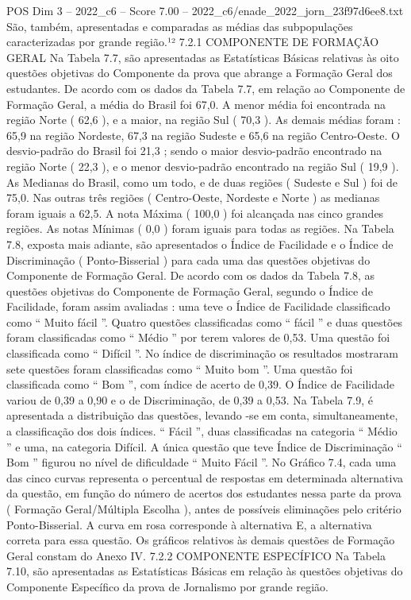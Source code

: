 \begin{textsample}{POS Dim 3 – 2022\_c6 – Score 7.00 – 2022\_c6/enade\_2022\_jorn\_23f97d6ee8.txt}
São, também, apresentadas e comparadas as médias das subpopulações caracterizadas por grande região.¹² 7.2.1 COMPONENTE DE FORMAÇÃO GERAL Na Tabela 7.7, são apresentadas as Estatísticas Básicas relativas às oito questões objetivas do Componente da prova que abrange a Formação Geral dos estudantes.
De acordo com os dados da Tabela 7.7, em relação ao Componente de Formação Geral, a média do Brasil foi 67,0.
A menor média foi encontrada na região Norte ( 62,6 ), e a maior, na região Sul ( 70,3 ).
As demais médias foram : 65,9 na região Nordeste, 67,3 na região Sudeste e 65,6 na região Centro-Oeste.
O desvio-padrão do Brasil foi 21,3 ; sendo o maior desvio-padrão encontrado na região Norte ( 22,3 ), e o menor desvio-padrão encontrado na região Sul ( 19,9 ).
As Medianas do Brasil, como um todo, e de duas regiões ( Sudeste e Sul ) foi de 75,0.
Nas outras três regiões ( Centro-Oeste, Nordeste e Norte ) as medianas foram iguais a 62,5.
A nota Máxima ( 100,0 ) foi alcançada nas cinco grandes regiões.
As notas Mínimas ( 0,0 ) foram iguais para todas as regiões.
Na Tabela 7.8, exposta mais adiante, são apresentados o Índice de Facilidade e o Índice de Discriminação ( Ponto-Bisserial ) para cada uma das questões objetivas do Componente de Formação Geral.
De acordo com os dados da Tabela 7.8, as questões objetivas do Componente de Formação Geral, segundo o Índice de Facilidade, foram assim avaliadas : uma teve o Índice de Facilidade classificado como “ Muito fácil ”.
Quatro questões classificadas como “ fácil ” e duas questões foram classificadas como “ Médio ” por terem valores de 0,53.
Uma questão foi classificada como “ Difícil ”.
No índice de discriminação os resultados mostraram sete questões foram classificadas como “ Muito bom ”.
Uma questão foi classificada como “ Bom ”, com índice de acerto de 0,39.
O Índice de Facilidade variou de 0,39 a 0,90 e o de Discriminação, de 0,39 a 0,53.
Na Tabela 7.9, é apresentada a distribuição das questões, levando -se em conta, simultaneamente, a classificação dos dois índices. “ Fácil ”, duas classificadas na categoria “ Médio ” e uma, na categoria Difícil.
A única questão que teve Índice de Discriminação “ Bom ” figurou no nível de dificuldade “ Muito Fácil ”.
No Gráfico 7.4, cada uma das cinco curvas representa o percentual de respostas em determinada alternativa da questão, em função do número de acertos dos estudantes nessa parte da prova ( Formação Geral/Múltipla Escolha ), antes de possíveis eliminações pelo critério Ponto-Bisserial.
A curva em rosa corresponde à alternativa E, a alternativa correta para essa questão.
Os gráficos relativos às demais questões de Formação Geral constam do Anexo IV. 7.2.2 COMPONENTE ESPECÍFICO Na Tabela 7.10, são apresentadas as Estatísticas Básicas em relação às questões objetivas do Componente Específico da prova de Jornalismo por grande região.

\end{textsample}
